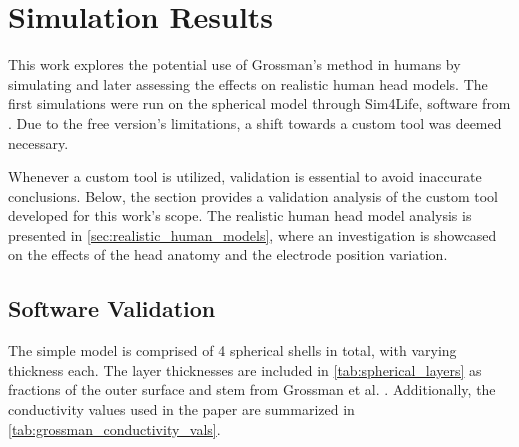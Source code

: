 \pagebreak
\chapter{Simulation Results}



This work explores the potential use of Grossman's \cite{Grossman2017} method in humans by simulating and later assessing the effects on realistic human head models. The first simulations were run on the spherical model through Sim4Life, software from . Due to the free version's limitations, a shift towards a custom tool was deemed necessary.

Whenever a custom tool is utilized, validation is essential to avoid inaccurate conclusions. Below, the  section provides a validation analysis of the custom tool developed for this work's scope. The realistic human head model analysis is presented in \autoref{sec:realistic_human_models}, where an investigation is showcased on the effects of the head anatomy and the electrode position variation.

\section{Software Validation}
\label{sec:soft_validation}

The simple model is comprised of 4 spherical shells in total, with varying thickness each. The layer thicknesses are included in \autoref{tab:spherical_layers} as fractions of the outer surface and stem from Grossman et al. \cite[Figure S2, J, and K]{Grossman2017}. Additionally, the conductivity values used in the paper are summarized in \autoref{tab:grossman_conductivity_vals}.

